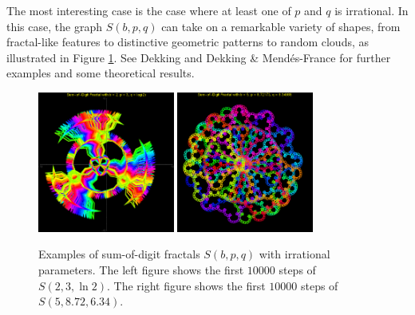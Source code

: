 \documentclass[11pt,leqno]{article}
\begin{document}
The most interesting case is the case where at least one of $p$ and $q$
is irrational.  In this case, the graph $S(b,p,q)$ can take on a
remarkable variety of shapes, from fractal-like features to distinctive
geometric patterns to random clouds, as illustrated in  Figure
\ref{fig:sum-of-digit-fractal-irrational-case}.  See Dekking
\cite{dekking1982} and Dekking \& Mend\'es-France
\cite{dekking-mendes-france1981} for further examples and some theoretical results. 

\begin{figure}[H]
\label{fig:sum-of-digit-fractal-irrational-case}
\centering
\includegraphics[width=0.4\textwidth]
{n(10000)_b(2)_p(3)_q(ln2).png}
\hspace{1em}
\includegraphics[width=0.4\textwidth]
{n(10000)_b(5)_p(8dot72)_q(6dot34).png}
\caption{Examples of sum-of-digit fractals $S(b,p,q)$ with 
irrational parameters. The left figure shows the 
first $10000$ steps of $S(2,3,\ln 2)$. 
The right figure shows the 
first $10000$ steps of $S(5,8.72,6.34)$. 
}
\end{figure}
\end{document}

